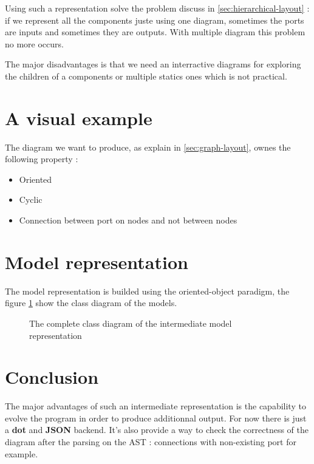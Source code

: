 Using such a representation solve the problem discuss in
\ref{sec:hierarchical-layout} : if we represent all the components juste using
one diagram, sometimes the ports are inputs and sometimes they are outputs. With
multiple diagram this problem no more occurs.

The major disadvantages is that we need an interractive diagrams for exploring
the children of a components or multiple statics ones which is not practical.

\section{A visual example}

The diagram we want to produce, as explain in \ref{sec:graph-layout}, ownes the following property :
\begin{itemize}
  \item Oriented
  \item Cyclic
  \item Connection between port on nodes and not between nodes
\end{itemize}

\section{Model representation}

The model representation is builded using the oriented-object paradigm, the figure \ref{fig:model-class-diagram} show the class diagram of the models.

\begin{figure}[H]
  \centering
  \caption[Class diagram of the intermediate model]{The complete class diagram of the intermediate model representation}
  \label{fig:model-class-diagram}
\end{figure}

\section{Conclusion}

The major advantages of such an intermediate representation is the capability to evolve the program in order to produce additionnal output. For now there is just a \textbf{dot} and \textbf{JSON} backend. It's also provide a way to check the correctness of the diagram after the parsing on the AST : connections with non-existing port for example.
